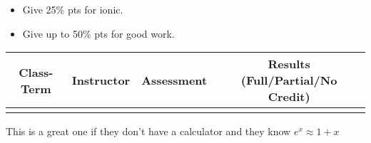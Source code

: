 \begin{rubric}
	\begin{itemize}
		\item Give 25\% pts for ionic. 
		\item Give up to 50\% pts for good work. 
	\end{itemize}
\end{rubric}

\begin{outcomes}
	\begin{center}
		\begin{tabular}{cccc}
			\hline\hline
                Class-Term & Instructor & Assessment & Results (Full/Partial/No Credit) \\
			\hline
                 &  &  &  \\
			\hline
		\end{tabular}
	\end{center}
\end{outcomes}

\begin{comments}

This is a great one if they don't have a calculator and they know $e^x \approx 1+x$
	
\end{comments}